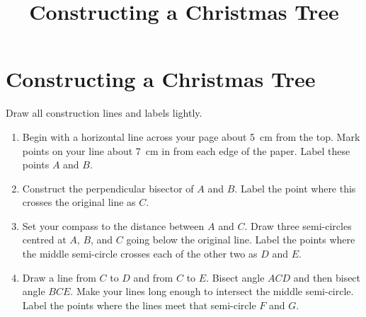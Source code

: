 \documentclass{article}
\title{Constructing a Christmas Tree}
\newcounter{tree}
\begin{document}
\section*{Constructing a Christmas Tree}

Draw all construction lines and labels lightly.

\begin{enumerate}
\item
\begin{multicols}{2}
Begin with a horizontal line across your page about \SI{5}{cm} from the top.
Mark points on your line about \SI{7}{cm} in from each edge of the paper.
Label these points \(A\) and \(B\).

\columnbreak
{}
\end{multicols}

\item
\begin{multicols}{2}
Construct the perpendicular bisector of \(A\) and \(B\).
Label the point where this crosses the original line as \(C\).

\columnbreak
{}
\end{multicols}

\item
\begin{multicols}{2}
Set your compass to the distance between \(A\) and \(C\).
Draw three semi-circles centred at \(A\), \(B\), and \(C\) going below the original line.
Label the points where the middle semi-circle crosses each of the other two as \(D\) and \(E\).

\columnbreak
{}
\end{multicols}

\newpage
\item 
\begin{multicols}{2}
Draw a line from \(C\) to \(D\) and from \(C\) to \(E\).
Bisect angle \(ACD\) and then bisect angle \(BCE\).
Make your lines long enough to intersect the middle semi-circle.
Label the points where the lines meet that semi-circle \(F\) and \(G\).


\end{multicols}
\end{enumerate}
\end{document}
